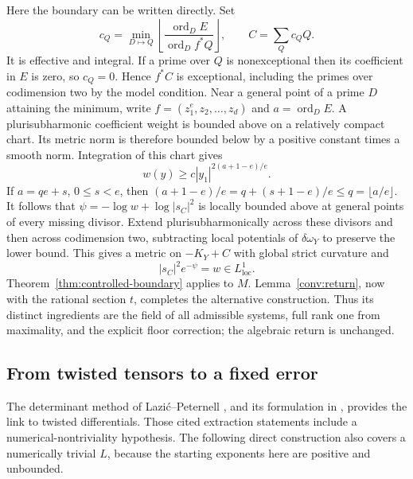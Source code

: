 Here the boundary can be written directly.  Set
\[
 c_Q=\min_{D\mapsto Q}
       \left\lfloor\frac{\operatorname{ord}_D E}
                            {\operatorname{ord}_D f^*Q}\right\rfloor,
 \qquad C=\sum_Qc_QQ.
\]
It is effective and integral.  If a prime over $Q$ is nonexceptional
then its coefficient in $E$ is zero, so $c_Q=0$.  Hence $f^*C$ is
exceptional, including the primes over codimension two by the model
condition.  Near a general point of a prime $D$ attaining the minimum,
write $f=(z_1^e,z_2,\ldots,z_d)$ and
$a=\operatorname{ord}_D E$.  A plurisubharmonic coefficient weight is
bounded above on a relatively compact chart.  Its metric norm is
therefore bounded below by a positive constant times a smooth norm.
Integration of this chart gives
\[
 w(y)\ge c|y_1|^{2(a+1-e)/e}.
\]
If $a=qe+s$, $0\le s<e$, then
$(a+1-e)/e=q+(s+1-e)/e\le q=\lfloor a/e\rfloor$.
It follows that
$\psi=-\log w+\log|s_C|^2$ is locally bounded above at general
points of every missing divisor.  Extend plurisubharmonically across
these divisors and then across codimension two, subtracting local
potentials of $\delta\omega_Y$ to preserve the lower bound.
This gives a metric on $-K_Y+C$ with global strict curvature and
\[
 |s_C|^2e^{-\psi}=w\in L^1_{\mathrm{loc}}.
\]
Theorem~\ref{thm:controlled-boundary} applies to $M$.
Lemma~\ref{conv:return}, now with the rational section $t$, completes
the alternative construction.  Thus its distinct ingredients are the
field of all admissible systems, full rank one from maximality, and the
explicit floor correction; the algebraic return is unchanged.

\subsection{From twisted tensors to a fixed error}
\label{conv:tensors}

The determinant method of Lazi\'c--Peternell
\cite[Lemma~4.1]{LP2018}, and its formulation in
\cite[Lemma~5.1]{LMPTX2023}, provides the link to twisted differentials.
Those cited extraction statements include a numerical-nontriviality
hypothesis.  The following direct construction also covers a numerically
trivial $L$, because the starting exponents here are positive and
unbounded.

